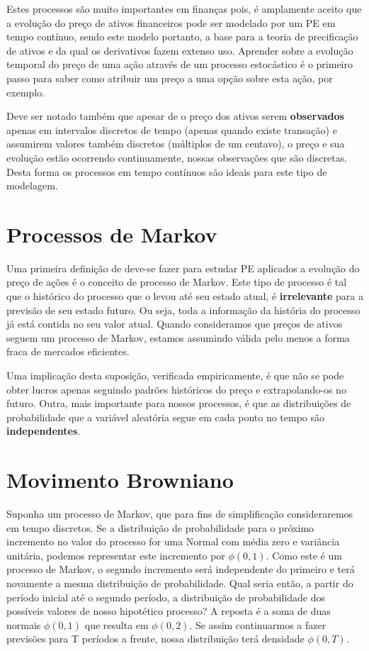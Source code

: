 \documentclass[]{book}
\theoremstyle{definition}
\theoremstyle{definition}
\theoremstyle{definition}
\theoremstyle{remark}
\begin{document}
Estes processos são muito importantes em finanças pois, é amplamente aceito que a evolução do preço de ativos financeiros pode ser modelado por um PE em tempo contínuo, sendo este modelo portanto, a base para a teoria de precificação de ativos e da qual os derivativos fazem extenso uso. Aprender sobre a evolução temporal do preço de uma ação através de um processo estocástico é o primeiro passo para saber como atribuir um preço a uma opção sobre esta ação, por exemplo.

Deve ser notado também que apesar de o preço dos ativos serem \textbf{observados} apenas em intervalos discretos de tempo (apenas quando existe transação) e assumirem valores também discretos (múltiplos de um centavo), o preço e sua evolução estão ocorrendo continuamente, nossas observações que são discretas. Desta forma os processos em tempo contínuos são ideais para este tipo de modelagem.

\hypertarget{markov}{%
\section{Processos de Markov}\label{markov}}

Uma primeira definição de deve-se fazer para estudar PE aplicados a evolução do preço de ações é o conceito de processo de Markov. Este tipo de processo é tal que o histórico do processo que o levou até seu estado atual, é \textbf{irrelevante} para a previsão de seu estado futuro. Ou seja, toda a informação da história do processo já está contida no seu valor atual. Quando consideramos que preços de ativos seguem um processo de Markov, estamos assumindo válida pelo menos a forma fraca de mercados eficientes.

Uma implicação desta suposição, verificada empiricamente, é que não se pode obter lucros apenas seguindo padrões históricos do preço e extrapolando-os no futuro. Outra, mais importante para nossos processos, é que as distribuições de probabilidade que a variável aleatória segue em cada ponto no tempo são \textbf{independentes}.

\hypertarget{mb}{%
\section{Movimento Browniano}\label{mb}}

Suponha um processo de Markov, que para fins de simplificação consideraremos em tempo discretos. Se a distribuição de probabilidade para o próximo incremento no valor do processo for uma Normal com média zero e variância unitária, podemos representar este incremento por \(\phi(0, 1)\). Como este é um processo de Markov, o segundo incremento será independente do primeiro e terá novamente a mesma distribuição de probabilidade. Qual seria então, a partir do período inicial até o segundo período, a distribuição de probabilidade dos possíveis valores de nosso hipotético processo? A reposta é a soma de duas normais \(\phi(0, 1)\) que resulta em \(\phi(0, 2)\). Se assim continuarmos a fazer previsões para T períodos a frente, nossa distribuição terá densidade \(\phi(0, T)\).
\end{document}
